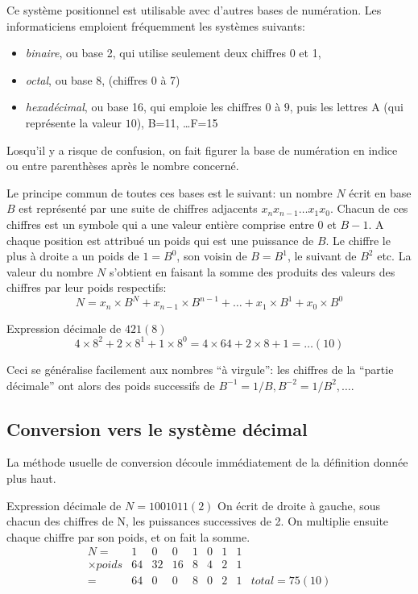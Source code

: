 Ce syst\`eme positionnel est utilisable avec d'autres bases de num\'eration.
Les informaticiens emploient fr\'equemment les syst\`emes suivants:
\begin{itemize}
\item {\em binaire}, ou base 2, qui utilise seulement deux chiffres 0 et 1,
\item {\em octal}, ou base 8, (chiffres 0 \`a 7)
\item {\em hexad\'ecimal}, ou base 16, qui emploie les chiffres $0$ \`a $9$, 
puis les lettres A (qui repr\'esente la valeur $10$), B=11, \ldots F=15
\end{itemize} 

Losqu'il y a risque de confusion, on fait figurer la base de num\'eration 
en indice ou entre parenth\`eses apr\`es le nombre concern\'e.

Le principe commun de toutes ces bases est le suivant: un nombre $N$ \'ecrit 
en base $B$ est 
repr\'esent\'e par une suite de chiffres adjacents $x_n x_{n-1} \ldots x_1 x_0$.
Chacun de ces chiffres est un symbole qui a une valeur enti\`ere comprise entre
0 et $B-1$. A chaque position est attribu\'e un poids qui est une puissance de 
$B$. Le chiffre le plus \`a droite a un poids de $1 = B^0$, son voisin 
de $B=B^1$, le suivant de $B^2$ etc. La valeur du nombre $N$ s'obtient en faisant
la somme des produits des valeurs des chiffres par leur poids respectifs:
$$N = x_n \times B^N + x_{n-1} \times B^{n-1} +  \ldots + x_1 \times B^1
+ x_0 \times B^0 $$

\begin{exemple}{Expression d\'ecimale de $421(8)$ }
$$4 \times 8^2 + 2 \times 8^1 + 1 \times 8^0 
= 4 \times 64 + 2 \times 8 + 1 = \ldots (10)$$
\end{exemple}

Ceci se g\'en\'eralise facilement aux nombres ``\`a virgule'': 
les chiffres de la ``partie 
d\'ecimale'' ont alors des poids successifs de 
$B^{-1} = 1/B, B^{-2} = 1/{B^2}, \ldots$.
 
\subsection{Conversion vers le syst\`eme d\'ecimal}

La m\'ethode usuelle de conversion d\'ecoule imm\'ediatement 
de la d\'efinition donn\'ee plus haut.

\begin{exemple}{Expression d\'ecimale de $N=1001011(2)$}
On \'ecrit de droite
\`a gauche, sous chacun des chiffres de N, les puissances successives de 2.
On multiplie ensuite chaque chiffre par son poids, et on fait la somme.
$$\begin{array}{r|rrrrrrr|l}
N= &1 & 0 & 0 & 1 & 0 & 1 & 1 \\
\times poids &64 &32& 16& 8& 4 &2 &1 \\
\hline
= &64 & 0 & 0 & 8 & 0 & 2 & 1 & total =  75 (10)
\end{array}$$
\end{exemple}


